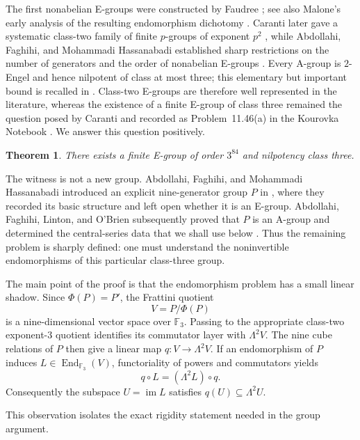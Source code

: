\documentclass[11pt]{amsart}
\newtheorem{theorem}{Theorem}[section]
\theoremstyle{definition}
\theoremstyle{remark}
\newcommand{\F}{\mathbb F}
\newcommand{\End}{\operatorname{End}}
\newcommand{\im}{\operatorname{im}}
\begin{document}
The first nonabelian E-groups were constructed by Faudree
\cite{Faudree71}; see also Malone's early analysis of the resulting
endomorphism dichotomy \cite{Malone77}.  Caranti later gave a systematic
class-two family of finite $p$-groups of exponent $p^2$
\cite{Caranti85}, while Abdollahi, Faghihi, and Mohammadi Hassanabadi
established sharp restrictions on the number of generators and the order of
nonabelian E-groups \cite{AFH08minimum}.  Every A-group is $2$-Engel and
hence nilpotent of class at most three; this elementary but important bound
is recalled in \cite[p.~1]{AFLObrien10}.  Class-two E-groups are therefore
well represented in the literature, whereas the existence of a finite
E-group of class three remained the question posed by Caranti and recorded
as Problem~11.46(a) in the Kourovka Notebook
\cite[Problem~11.46(a)]{Kourovka21}.  We answer this question positively.

\begin{theorem}\label{thm:intro}
There exists a finite E-group of order $3^{84}$ and nilpotency class three.
\end{theorem}

The witness is not a new group.  Abdollahi, Faghihi, and Mohammadi
Hassanabadi introduced an explicit nine-generator group $P$ in
\cite[Remark~2.1]{AFH08three}, where they recorded its basic structure and
left open whether it is an E-group.  Abdollahi, Faghihi, Linton, and
O'Brien subsequently proved that $P$ is an A-group and determined the
central-series data that we shall use below
\cite[pp.~1--2]{AFLObrien10}.  Thus the remaining problem is sharply
defined: one must understand the noninvertible endomorphisms of this
particular class-three group.

The main point of the proof is that the endomorphism problem has a small
linear shadow.  Since $\Phi(P)=P'$, the Frattini quotient
\[
                              V=P/\Phi(P)
\]
is a nine-dimensional vector space over $\F_3$.  Passing to the appropriate
class-two exponent-$3$ quotient identifies its commutator layer with
$\Lambda^2V$.  The nine cube relations of $P$ then give a linear map
$q:V\to\Lambda^2V$.  If an endomorphism of $P$ induces
$L\in\End_{\F_3}(V)$, functoriality of powers and commutators yields
\begin{equation}\label{eq:intro-nat}
                  q\circ L=(\Lambda^2L)\circ q.
\end{equation}
Consequently the subspace $U=\im L$ satisfies
$q(U)\subseteq\Lambda^2U$.

This observation isolates the exact rigidity statement needed in the group
argument.
\end{document}

